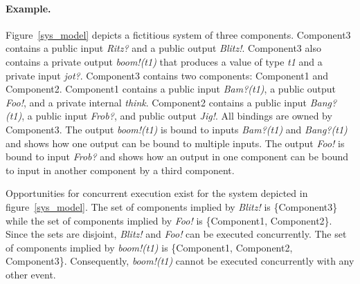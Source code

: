 \paragraph{Example.}
Figure~\ref{sys_model} depicts a fictitious system of three components.
Component3 contains a public input \emph{Ritz?} and a public output \emph{Blitz!}.
Component3 also contains a private output \emph{boom!(t1)} that produces a value of type \emph{t1} and a private input \emph{jot?}.
Component3 contains two components: Component1 and Component2.
Component1 contains a public input \emph{Bam?(t1)}, a public output \emph{Foo!}, and a private internal \emph{think}.
Component2 contains a public input \emph{Bang?(t1)}, a public input \emph{Frob?}, and public output \emph{Jig!}.
All bindings are owned by Component3.
The output \emph{boom!(t1)} is bound to inputs \emph{Bam?(t1)} and \emph{Bang?(t1)} and shows how one output can be bound to multiple inputs.
The output \emph{Foo!} is bound to input \emph{Frob?} and shows how an output in one component can be bound to input in another component by a third component.

Opportunities for concurrent execution exist for the system depicted in figure~\ref{sys_model}.
The set of components implied by \emph{Blitz!} is \{Component3\} while the set of components implied by \emph{Foo!} is \{Component1, Component2\}.
Since the sets are disjoint, \emph{Blitz!} and \emph{Foo!} can be executed concurrently.
The set of components implied by \emph{boom!(t1)} is \{Component1, Component2, Component3\}.
Consequently, \emph{boom!(t1)} cannot be executed concurrently with any other event.




